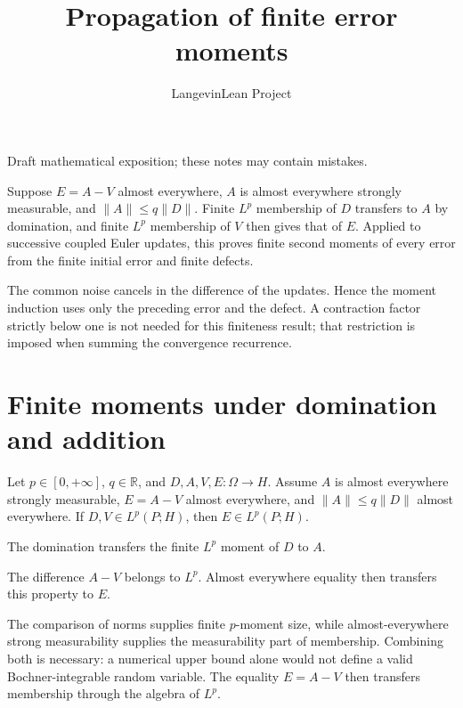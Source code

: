 \documentclass[11pt,a4paper]{article}
\title{\texorpdfstring{Propagation of finite error moments}{Propagation of finite error moments}}
\author{LangevinLean Project}
\date{}
\begin{document}
\maketitle
Draft mathematical exposition; these notes may contain mistakes.


Suppose \(E=A-V\) almost everywhere, \(A\) is almost everywhere strongly measurable, and \(\|A\|\le q\|D\|\). Finite \(L^p\) membership of \(D\) transfers to \(A\) by domination, and finite \(L^p\) membership of \(V\) then gives that of \(E\). Applied to successive coupled Euler updates, this proves finite second moments of every error from the finite initial error and finite defects.



The common noise cancels in the difference of the updates. Hence the moment induction uses only the preceding error and the defect. A contraction factor strictly below one is not needed for this finiteness result; that restriction is imposed when summing the convergence recurrence.


\section{\texorpdfstring{Finite moments under domination and addition}{Finite moments under domination and addition}}


Let \(p\in[0,+\infty]\), \(q\in\mathbb R\), and \(D,A,V,E:\Omega\to H\). Assume \(A\) is almost everywhere strongly measurable, \(E=A-V\) almost everywhere, and \(\|A\|\le q\|D\|\) almost everywhere. If \(D,V\in L^p(P;H)\), then \(E\in L^p(P;H)\).



The domination transfers the finite \(L^p\) moment of \(D\) to \(A\).



The difference \(A-V\) belongs to \(L^p\). Almost everywhere equality then transfers this property to \(E\).



The comparison of norms supplies finite \(p\)-moment size, while almost-everywhere strong measurability supplies the measurability part of membership. Combining both is necessary: a numerical upper bound alone would not define a valid Bochner-integrable random variable. The equality \(E=A-V\) then transfers membership through the algebra of \(L^p\).
\end{document}
